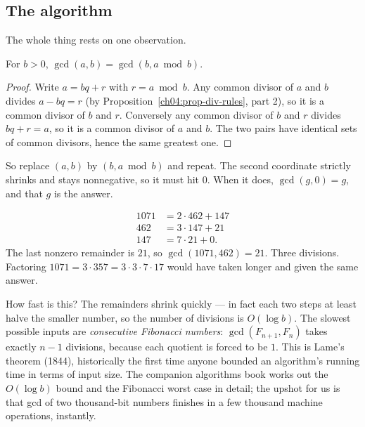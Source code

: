 \subsection*{The algorithm}

The whole thing rests on one observation.

\begin{lemma}
\label{ch04:lem-gcd-mod}
For $b > 0$, $\gcd(a, b) = \gcd(b, a \bmod b)$.
\end{lemma}

\begin{proof}
Write $a = bq + r$ with $r = a \bmod b$. Any common divisor of $a$ and $b$ divides
$a - bq = r$ (by Proposition~\ref{ch04:prop-div-rules}, part 2), so it is a common divisor of $b$
and $r$. Conversely any common divisor of $b$ and $r$ divides $bq + r = a$, so it is a common
divisor of $a$ and $b$. The two pairs have identical sets of common divisors, hence the same
greatest one.
\end{proof}

So replace $(a, b)$ by $(b, a \bmod b)$ and repeat. The second coordinate strictly shrinks and stays
nonnegative, so it must hit $0$. When it does, $\gcd(g, 0) = g$, and that $g$ is the answer.

\begin{example}
\label{ch04:ex-gcd-1071}
\[
\begin{aligned}
1071 &= 2 \cdot 462 + 147 \\
 462 &= 3 \cdot 147 + 21 \\
 147 &= 7 \cdot 21 + 0.
\end{aligned}
\]
The last nonzero remainder is $21$, so $\gcd(1071, 462) = 21$. Three divisions. Factoring
$1071 = 3 \cdot 357 = 3 \cdot 3 \cdot 7 \cdot 17$ would have taken longer and given the same
answer.
\end{example}

\begin{connectionbox}
How fast is this? The remainders shrink quickly --- in fact each two steps at least halve the
smaller number, so the number of divisions is $O(\log b)$. The slowest possible inputs are
\emph{consecutive Fibonacci numbers}: $\gcd(F_{n+1}, F_n)$ takes exactly $n-1$ divisions, because
each quotient is forced to be $1$. This is Lame's theorem (1844), historically the first time
anyone bounded an algorithm's running time in terms of input size. The companion algorithms book
works out the $O(\log b)$ bound and the Fibonacci worst case in detail; the upshot for us is that
gcd of two thousand-bit numbers finishes in a few thousand machine operations, instantly.
\end{connectionbox}

